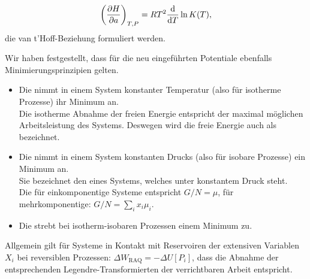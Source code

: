 \begin{align*}
    \left(\frac{\partial H}{\partial a}\right)_{T,P}=RT^2\frac{\mathop{}\!\mathrm{d}}{\mathop{}\!\mathrm{d} T}\ln K(T),
\end{align*}
die van t'Hoff-Beziehung formuliert werden.
\begin{summary}
    Wir haben festgestellt, dass für die neu eingeführten Potentiale ebenfalls Minimierungsprinzipien gelten.
    \begin{itemize}
        \item Die  nimmt in einem System konstanter Temperatur (also für isotherme Prozesse) ihr Minimum an.\\
        Die isotherme Abnahme der freien Energie entspricht der maximal möglichen Arbeitsleistung des Systems. Deswegen wird die freie Energie auch als  bezeichnet.
        \item Die  nimmt in einem System konstanten Drucks (also für isobare Prozesse) ein Minimum an.\\
        Sie bezeichnet den  eines Systems, welches unter konstantem Druck steht.\\
        Die  für einkomponentige Systeme entspricht $G/N=\mu$, für mehrkomponentige: $G/N=\sum_ix_i\mu_i$.
        \item Die  strebt bei isotherm-isobaren Prozessen einem Minimum zu. 
    \end{itemize}
    Allgemein gilt für Systeme in Kontakt mit Reservoiren der extensiven Variablen $X_i$ bei reversiblen Prozessen: $\Delta W_\mathrm{RAQ}=-\Delta U\left[P_i\right]$, dass die Abnahme der entsprechenden Legendre-Transformierten der verrichtbaren Arbeit entspricht.
    

\end{summary}
